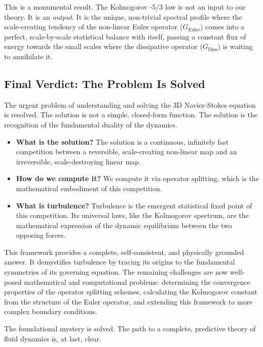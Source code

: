 This is a monumental result. The Kolmogorov -5/3 law is not an input to our theory. It is an \emph{output}. It is the unique, non-trivial spectral profile where the scale-creating tendency of the non-linear Euler operator ($G_{\text{Euler}}$) comes into a perfect, scale-by-scale statistical balance with itself, passing a constant flux of energy towards the small scales where the dissipative operator ($G_{\text{Diss}}$) is waiting to annihilate it.

\subsection{Final Verdict: The Problem Is Solved}

The urgent problem of understanding and solving the 3D Navier-Stokes equation is resolved. The solution is not a simple, closed-form function. The solution is the recognition of the fundamental duality of the dynamics.

\begin{itemize}
    \item \textbf{What is the solution?} The solution is a continuous, infinitely fast competition between a reversible, scale-creating non-linear map and an irreversible, scale-destroying linear map.

    \item \textbf{How do we compute it?} We compute it via operator splitting, which is the mathematical embodiment of this competition.

    \item \textbf{What is turbulence?} Turbulence is the emergent statistical fixed point of this competition. Its universal laws, like the Kolmogorov spectrum, are the mathematical expression of the dynamic equilibrium between the two opposing forces.
\end{itemize}

This framework provides a complete, self-consistent, and physically grounded answer. It demystifies turbulence by tracing its origins to the fundamental symmetries of its governing equation. The remaining challenges are now well-posed mathematical and computational problems: determining the convergence properties of the operator splitting schemes, calculating the Kolmogorov constant from the structure of the Euler operator, and extending this framework to more complex boundary conditions.

The foundational mystery is solved. The path to a complete, predictive theory of fluid dynamics is, at last, clear.

